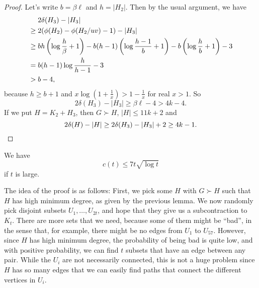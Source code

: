 \documentclass[a4paper]{article}
\begin{document}
\begin{proof}
  Let's write $b = \beta \ell$ and $h = |H_2|$. Then by the usual argument, we have
  \begin{align*}
    &\hphantom{ {}\geq{}}2 \delta (H_3) - |H_3| \\
    &\geq 2 (\phi(H_2) - \phi(H_2/uv) - 1) - |H_3|\\
    &\geq bh \left(\log \frac{h}{\beta} + 1\right) - b (h - 1) \left(\log \frac{h - 1}{b} + 1\right) - b \left(\log \frac{h}{b} + 1\right) - 3\\%
    &= b(h - 1) \log \frac{h}{h - 1} - 3\\
    &> b - 4,
  \end{align*}
  because $h \geq b + 1$ and $x \log \left(1 + \frac{1}{x}\right) > 1 - \frac{1}{x}$ for real $x > 1$. So
  \[
    2 \delta (H_3) - |H_3| \geq \beta \ell - 4 > 4k - 4.
  \]
  If we put $H = K_2 + H_3$, then $G \succ H$, $|H| \leq 11k + 2$ and
  \[
    2\delta (H) - |H| \geq 2 \delta(H_3) - |H_3| + 2 \geq 4k - 1.\qedhere
  \]
\end{proof}


\begin{thm}
  We have
  \[
    c(t) \leq 7 t \sqrt{\log t}
  \]
  if $t$ is large.
\end{thm}

The idea of the proof is as follows: First, we pick some $H$ with $G \succ H$ such that $H$ has high minimum degree, as given by the previous lemma. We now randomly pick disjoint subsets $U_1, \ldots, U_{2t}$, and hope that they give us a subcontraction to $K_t$. There are more sets that we need, because some of them might be ``bad'', in the sense that, for example, there might be no edges from $U_1$ to $U_{57}$. However, since $H$ has high minimum degree, the probability of being bad is quite low, and with positive probability, we can find $t$ subsets that have an edge between any pair. While the $U_i$ are not necessarily connected, this is not a huge problem since $H$ has so many edges that we can easily find paths that connect the different vertices in $U_i$.
\end{document}
